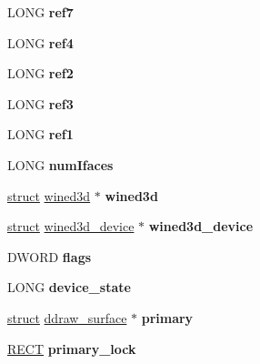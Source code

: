 \begin{DoxyCompactItemize}
\mbox{\label{structddraw_a4c22b3bfd0ee3737ac86a7e222a4c1b7}} 
L\+O\+NG {\bfseries ref7}
\item 
\mbox{\label{structddraw_a9e25f33b46e1907a9e07f765ff3ca80c}} 
L\+O\+NG {\bfseries ref4}
\item 
\mbox{\label{structddraw_ad55e00f92841a4a08a099ba6e7163573}} 
L\+O\+NG {\bfseries ref2}
\item 
\mbox{\label{structddraw_ad5ccb25d7cd56e88013dc307d55fc0e8}} 
L\+O\+NG {\bfseries ref3}
\item 
\mbox{\label{structddraw_a14cceda1e365637d0a327e1815e91ae9}} 
L\+O\+NG {\bfseries ref1}
\item 
\mbox{\label{structddraw_a94c3175a07f310b61242d4a0418830a8}} 
L\+O\+NG {\bfseries num\+Ifaces}
\item 
\mbox{\label{structddraw_ad2c1b46e716ed56789d248d1251dd863}} 
\hyperlink{interfacestruct}{struct} \hyperlink{structwined3d}{wined3d} $\ast$ {\bfseries wined3d}
\item 
\mbox{\label{structddraw_a237db68d68b0478e2b4f969ca2295ba2}} 
\hyperlink{interfacestruct}{struct} \hyperlink{structwined3d__device}{wined3d\+\_\+device} $\ast$ {\bfseries wined3d\+\_\+device}
\item 
\mbox{\label{structddraw_a09e2ba75f83594b227a69060f29d8b4c}} 
D\+W\+O\+RD {\bfseries flags}
\item 
\mbox{\label{structddraw_a2bbeae6e0929909701ca2f997b7a92c8}} 
L\+O\+NG {\bfseries device\+\_\+state}
\item 
\mbox{\label{structddraw_a1871073ab438ca82d4d74e1b964ba60b}} 
\hyperlink{interfacestruct}{struct} \hyperlink{structddraw__surface}{ddraw\+\_\+surface} $\ast$ {\bfseries primary}
\item 
\mbox{\label{structddraw_a1f68a2bb7781ebb36931b6122ddafcf0}} 
\hyperlink{structtag_r_e_c_t}{R\+E\+CT} {\bfseries primary\+\_\+lock}

\end{DoxyCompactItemize}
